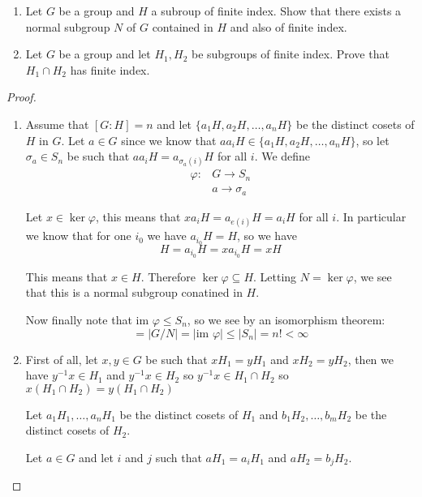     \begin{exercise}
        \begin{enumerate}[label = (\alph*)]
            \item Let $G$ be a group and $H$ a subroup of finite index. Show that there exists a normal subgroup $N$ of $G$ contained in $H$ and also of finite index.
            \item Let $G$ be a group and let $H_1,H_2$ be subgroups of finite index. Prove that $H_1\cap H_2$ has finite index.
        \end{enumerate}
    \begin{proof}
        \begin{enumerate}[label = (\alph*)]
            \item Assume that $[G\colon H] = n$ and let $\{a_1H,a_2H,\dots, {a_n}H\}$ be the distinct cosets of $H$ in $G$. Let $a\in G$ since we know that ${aa_i}H\in \{a_1H,a_2H,\dots, {a_n}H\}$, so let $\sigma_a\in S_n$ be such that ${aa_i}H = {a_{\sigma_a(i)}}H$ for all $i$. We define\begin{align*}
                \varphi\colon &G\rightarrow S_n\\
                              &a\rightarrow \sigma_a
            \end{align*} 

            Let $x\in \ker \varphi$, this means that ${xa_i}H = a_{e(i)}H = {a_i}H$ for all $i$. In particular we know that for one $i_0$ we have ${a_{i_0}}H = H$, so we have \[H={a_{i_0}}H = x{a_{i_0}}H = xH\]

            This means that $x\in H$. Therefore $\ker\varphi \subseteq H$. Letting $N = \ker\varphi$, we see that this is a normal subgroup conatined in $H$.

            Now finally note that $\text{im }\varphi\leq S_n$, so we see by an isomorphism theorem:\begin{equation*}
                [G\colon N] = |G/N| = |\text{im }\varphi| \leq |S_n| = n!<\infty
            \end{equation*}
            \item First of all, let $x,y\in G$ be such that $xH_1 = yH_1$ and $xH_2 = yH_2$, then we have $y^{-1}x\in H_1$ and $y^{-1}x\in H_2$ so $y^{-1}x\in H_1\cap H_2$ so $x(H_1\cap H_2) = y(H_1\cap H_2)$ 
            
            
            Let $a_1H_1,\ldots, {a_n}H_1$ be the distinct cosets of $H_1$ and $b_1H_2,\ldots, {b_m}H_2$ be the distinct cosets of $H_2$.
            
            Let $a\in G$ and let $i$ and $j$ such that $aH_1 = {a_i}H_1$ and $aH_2 = {b_j}H_2$.
        \end{enumerate}
    \end{proof}
    \end{exercise}

